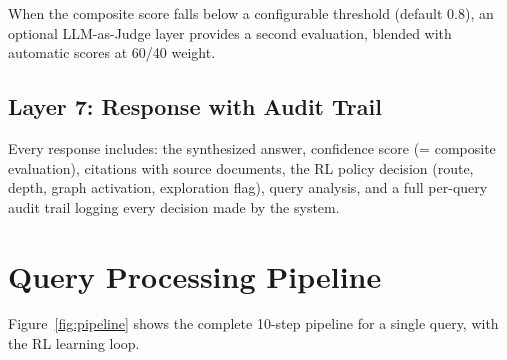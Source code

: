 \documentclass[11pt]{article}
\begin{document}
When the composite score falls below a configurable threshold (default 0.8), an optional LLM-as-Judge layer provides a second evaluation, blended with automatic scores at 60/40 weight.

\subsection{Layer 7: Response with Audit Trail}

Every response includes: the synthesized answer, confidence score (= composite evaluation), citations with source documents, the RL policy decision (route, depth, graph activation, exploration flag), query analysis, and a full per-query audit trail logging every decision made by the system.

\section{Query Processing Pipeline}
\label{sec:pipeline}

Figure~\ref{fig:pipeline} shows the complete 10-step pipeline for a single query, with the RL learning loop.
\end{document}
